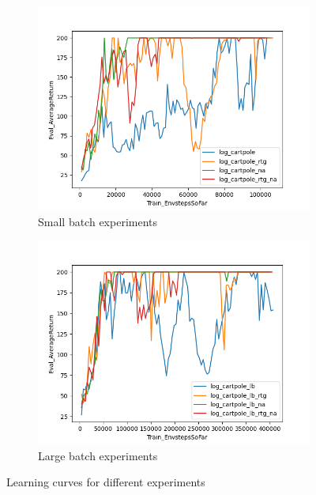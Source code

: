 \documentclass{article}
\begin{document}
\begin{itemize}
\begin{figure}[h]
        \centering
        \begin{subfigure}{0.45\textwidth}
                \centering
                \includegraphics[width=\linewidth]{./report/assets/all_E1-1.png} %
                \caption{Small batch experiments}
                \label{fig:graph1}
        \end{subfigure}
        \hfill
        \begin{subfigure}{0.45\textwidth}
                \centering
                \includegraphics[width=\linewidth]{./report/assets/all_E1-2.png} %
                \caption{Large batch experiments}
                \label{fig:graph2}
        \end{subfigure}
        \caption{Learning curves for different experiments}
        \label{fig:graphs}
\end{figure}



\end{itemize}
\end{document}
